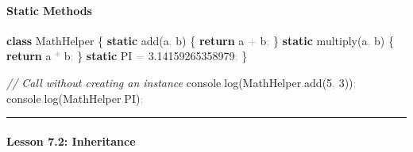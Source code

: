 \documentclass[
  justified,
  openright,
]{tufte-book}
\let\subsection\paragraph
\let\paragraph\paragraph
\newcommand{\KeywordTok}[1]{\textcolor{CodeKeyword}{\textbf{#1}}}  %
\newcommand{\CommentTok}[1]{\textcolor{CodeComment}{\textit{#1}}}  %
\newcommand{\CodeNumTok}[1]{\textcolor{CodeNumber}{#1}}             %
\newcommand{\CodeFuncTok}[1]{\textcolor{CodeKeyword}{#1}}           %
\newcommand{\CodeTypeTok}[1]{\textcolor{CodeType}{#1}}              %
\newcommand{\OperatorTok}[1]{\textcolor{DarkGray}{#1}}              %
\newenvironment{Shaded}{%
  \begin{mdframed}[style=TufteCode]%
}{%
  \end{mdframed}%
}
\let\subsection\paragraph
\let\paragraph\paragraph
\begin{document}
\subsection{Static Methods}\label{static-methods}

\begin{Shaded}
\begin{Highlighting}[]
\KeywordTok{class} MathHelper \{
  \KeywordTok{static} \CodeFuncTok{add}(a\OperatorTok{,} b) \{
    \KeywordTok{return} a \OperatorTok{+} b\OperatorTok{;}
  \}
  \KeywordTok{static} \CodeFuncTok{multiply}(a\OperatorTok{,} b) \{
    \KeywordTok{return} a \OperatorTok{*} b\OperatorTok{;}
  \}
  \KeywordTok{static} \CodeNumTok{PI} \OperatorTok{=} \CodeNumTok{3.14159265358979}\OperatorTok{;}
\}
 
\CommentTok{// Call without creating an instance}
console\OperatorTok{.}\CodeFuncTok{log}(MathHelper\OperatorTok{.}\CodeFuncTok{add}(\CodeNumTok{5}\OperatorTok{,} \CodeNumTok{3}))\OperatorTok{;}
console\OperatorTok{.}\CodeFuncTok{log}(MathHelper\OperatorTok{.}\CodeTypeTok{PI})\OperatorTok{;}
\end{Highlighting}
\end{Shaded}

\begin{center}\rule{0.5\linewidth}{0.5pt}\end{center}

\subsection{Lesson 7.2: Inheritance}\label{lesson-7.2-inheritance}
\end{document}
